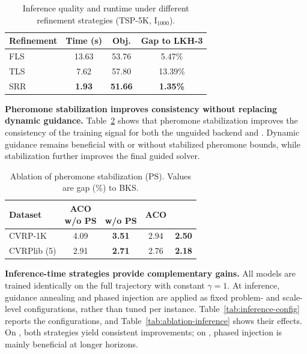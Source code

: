 \begin{table}[h]
\centering
\caption{Inference quality and runtime under different refinement strategies (TSP-5K, I$_{1000}$).}
\label{tab:srr-inference}
\small
\renewcommand{\arraystretch}{0.85}
\begin{tabular*}{\columnwidth}{@{\extracolsep{\fill}}lccc@{}}
\toprule
Refinement & Time (s) & Obj. & Gap to LKH-3 \\
\midrule
FLS & 13.63 & 53.76 & 5.47\% \\
TLS & 7.62 & 57.80 & 13.39\% \\
SRR & \textbf{1.93} & \textbf{51.66} & \textbf{1.35\%} \\
\bottomrule
\end{tabular*}
\end{table}

\smallskip\noindent\textbf{Pheromone stabilization improves consistency without replacing dynamic guidance.}
Table~\ref{tab:ps-ablation} shows that pheromone stabilization improves the consistency of the training signal for both the unguided backend and \DyNACO{}. Dynamic guidance remains beneficial with or without stabilized pheromone bounds, while stabilization further improves the final guided solver.

\begin{table}[h]
\centering
\caption{Ablation of pheromone stabilization (PS). Values are gap (\%) to BKS.}
\label{tab:ps-ablation}
\small
\renewcommand{\arraystretch}{0.85}
\setlength{\tabcolsep}{2.5pt}
\begin{tabular*}{\columnwidth}{@{\extracolsep{\fill}}lcccc@{}}
\toprule
Dataset & \shortstack{ACO\\w/o PS} & \shortstack{\DyNACO{}\\w/o PS} & ACO & \DyNACO{} \\
\midrule
CVRP-1K & 4.09 & \textbf{3.51} & 2.94 & \textbf{2.50} \\
CVRPlib (5) & 2.91 & \textbf{2.71} & 2.76 & \textbf{2.18} \\
\bottomrule
\end{tabular*}
\end{table}

\smallskip\noindent\textbf{Inference-time strategies provide complementary gains.}
All models are trained identically on the full trajectory with constant $\gamma{=}1$. At inference, guidance annealing and phased injection are applied as fixed problem- and scale-level configurations, rather than tuned per instance. Table~\ref{tab:inference-config} reports the configurations, and Table~\ref{tab:ablation-inference} shows their effects. On \TSP{}, both strategies yield consistent improvements; on \CVRP{}, phased injection is mainly beneficial at longer horizons.

